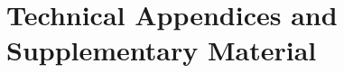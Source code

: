 \documentclass{article}
\begin{document}
{
\small

 







}



\appendix

\section{Technical Appendices and Supplementary Material}
\end{document}
